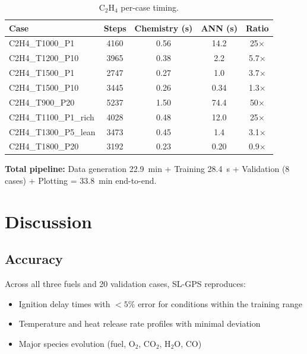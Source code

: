 \documentclass[11pt,a4paper]{article}
\begin{document}
\begin{table}[H]
\centering
\caption{C$_2$H$_4$ per-case timing.}
\label{tab:c2h4_timing}
\begin{tabular}{lcccc}
\toprule
\textbf{Case} & \textbf{Steps} & \textbf{Chemistry (s)} & \textbf{ANN (s)} & \textbf{Ratio} \\
\midrule
C2H4\_T1000\_P1 & 4160 & 0.56 & 14.2 & 25$\times$ \\
C2H4\_T1200\_P10 & 3965 & 0.38 & 2.2 & 5.7$\times$ \\
C2H4\_T1500\_P1 & 2747 & 0.27 & 1.0 & 3.7$\times$ \\
C2H4\_T1500\_P10 & 3445 & 0.26 & 0.34 & 1.3$\times$ \\
\midrule
C2H4\_T900\_P20 & 5237 & 1.50 & 74.4 & 50$\times$ \\
C2H4\_T1100\_P1\_rich & 4028 & 0.48 & 12.0 & 25$\times$ \\
C2H4\_T1300\_P5\_lean & 3473 & 0.45 & 1.4 & 3.1$\times$ \\
C2H4\_T1800\_P20 & 3192 & 0.23 & 0.20 & 0.9$\times$ \\
\bottomrule
\end{tabular}
\end{table}

\textbf{Total pipeline:} Data generation 22.9~min + Training 28.4~s + Validation (8 cases) + Plotting = 33.8~min end-to-end.

\newpage
\section{Discussion}
\label{sec:discussion}

\subsection{Accuracy}

Across all three fuels and 20 validation cases, SL-GPS reproduces:
\begin{itemize}
    \item Ignition delay times with $<5\%$ error for conditions within the training range
    \item Temperature and heat release rate profiles with minimal deviation
    \item Major species evolution (fuel, O$_2$, CO$_2$, H$_2$O, CO)
\end{itemize}
\end{document}
